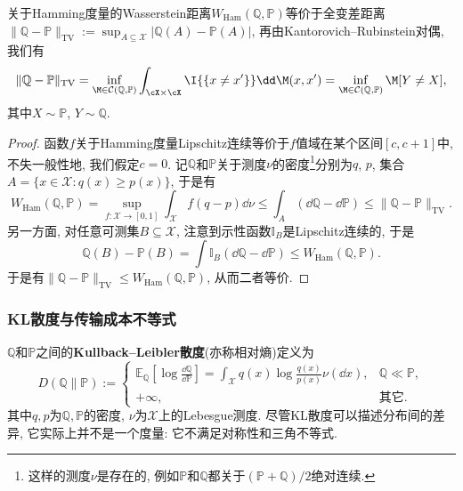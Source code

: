 \begin{example}[Hamming度量和全变差距离]\label{ex:HammingMetricAndTVDistance}
	关于Hamming度量的Wasserstein距离$W_{\text{Ham}}(\mathbb{Q}, \mathbb{P})$等价于全变差距离$\|\mathbb{Q} - \mathbb{P}\|_{\text{TV}} := \sup_{A \subseteq \mathcal{X}} |\mathbb{Q}(A) - \mathbb{P}(A)|$, 再由Kantorovich–Rubinstein对偶, 我们有
	\begin{equation*}
		\|\mathbb{Q} - \mathbb{P}\|_{\text{TV}}
		= \inf_{\M \in \mathcal{C}(\mathbb{Q}, \mathbb{P})} \int_{\cX \times \cX} \I{\{x \neq x'\}} \dd \M(x, x')
		= \inf_{\M \in \mathcal{C}(\mathbb{Q}, \mathbb{P})} \M[Y \neq X], 
	\end{equation*}
	其中$X \sim \mathbb{P}$, $Y \sim \mathbb{Q}$. 
	\begin{proof}
	函数$f$关于Hamming度量Lipschitz连续等价于$f$值域在某个区间$[c, c+1]$中, 不失一般性地, 我们假定$c = 0$. 
	记$\mathbb{Q}$和$\mathbb{P}$关于测度$\nu$的密度\footnote{这样的测度$\nu$是存在的, 例如$\mathbb{P}$和$\mathbb{Q}$都关于$(\mathbb{P} + \mathbb{Q})/2$绝对连续.}分别为$q$, $p$, 集合$A = \{x \in \mathcal{X} \colon q(x) \geq p(x)\} $, 于是有
	\begin{equation*}
		W_{\text{Ham}}(\mathbb{Q}, \mathbb{P})
		= \sup_{f \colon \mathcal{X} \to [0, 1]} \int_{\mathcal{X}} f (q - p) \dd \nu 
		\leq \int_A (\dd \mathbb{Q} - \dd \mathbb{P})
		\leq \|\mathbb{Q} - \mathbb{P}\|_{\text{TV}}. 
	\end{equation*}
	另一方面, 对任意可测集$B \subseteq \mathcal{X}$, 注意到示性函数$\mathbb{I}_B$是Lipschitz连续的, 于是
	\begin{equation*}
		\mathbb{Q}(B) - \mathbb{P}(B) 
		= \int \mathbb{I}_B (\dd \mathbb{Q} - \dd \mathbb{P}) 
		\leq W_{\text{Ham}}(\mathbb{Q}, \mathbb{P}). 
	\end{equation*}
	于是有$\|\mathbb{Q} - \mathbb{P}\|_{\text{TV}} \leq W_{\text{Ham}}(\mathbb{Q}, \mathbb{P})$, 从而二者等价. 
	\end{proof}
\end{example}

\subsubsection{KL散度与传输成本不等式}

 $\mathbb{Q}$和$\mathbb{P}$之间的\textbf{Kullback–Leibler散度}(亦称相对熵)定义为
\begin{equation}
	D(\mathbb{Q} \| \mathbb{P})
	:= \begin{cases}
		\mathbb{E}_{\mathbb{Q}} \left[ \log \frac{\dd \mathbb{Q}}{\dd \mathbb{P}} \right]
		= \int_{\mathcal{X}} q(x) \log \frac{q(x)}{p(x)} \nu(\dd x), & \mathbb{Q} \ll \mathbb{P}, \\
		+\infty, &\text{其它}. 
	\end{cases} 
\end{equation}
其中$q, p$为$\mathbb{Q}, \mathbb{P}$的密度, $\nu$为$\mathcal{X}$上的Lebesgue测度. 
尽管KL散度可以描述分布间的差异, 它实际上并不是一个度量: 它不满足对称性和三角不等式. 

